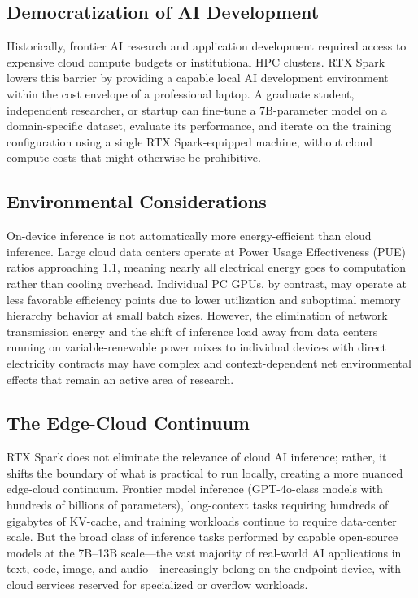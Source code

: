 \documentclass[conference]{IEEEtran}
\begin{document}
\subsection{Democratization of AI Development}

Historically, frontier AI research and application development required access to expensive cloud compute budgets or institutional HPC clusters. RTX Spark lowers this barrier by providing a capable local AI development environment within the cost envelope of a professional laptop. A graduate student, independent researcher, or startup can fine-tune a 7B-parameter model on a domain-specific dataset, evaluate its performance, and iterate on the training configuration using a single RTX Spark-equipped machine, without cloud compute costs that might otherwise be prohibitive.

\subsection{Environmental Considerations}

On-device inference is not automatically more energy-efficient than cloud inference. Large cloud data centers operate at Power Usage Effectiveness (PUE) ratios approaching 1.1, meaning nearly all electrical energy goes to computation rather than cooling overhead. Individual PC GPUs, by contrast, may operate at less favorable efficiency points due to lower utilization and suboptimal memory hierarchy behavior at small batch sizes. However, the elimination of network transmission energy and the shift of inference load away from data centers running on variable-renewable power mixes to individual devices with direct electricity contracts may have complex and context-dependent net environmental effects that remain an active area of research.

\subsection{The Edge-Cloud Continuum}

RTX Spark does not eliminate the relevance of cloud AI inference; rather, it shifts the boundary of what is practical to run locally, creating a more nuanced edge-cloud continuum. Frontier model inference (GPT-4o-class models with hundreds of billions of parameters), long-context tasks requiring hundreds of gigabytes of KV-cache, and training workloads continue to require data-center scale. But the broad class of inference tasks performed by capable open-source models at the 7B--13B scale---the vast majority of real-world AI applications in text, code, image, and audio---increasingly belong on the endpoint device, with cloud services reserved for specialized or overflow workloads.
\end{document}
